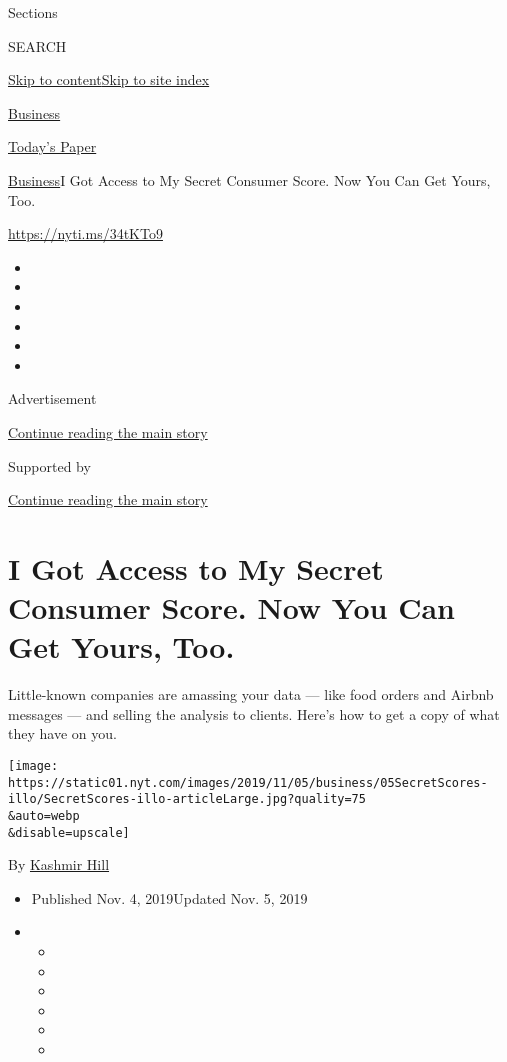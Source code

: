 Sections

SEARCH

\protect\hyperlink{site-content}{Skip to
content}\protect\hyperlink{site-index}{Skip to site index}

\href{https://www.nytimes.com/section/business}{Business}

\href{https://myaccount.nytimes.com/auth/login?response_type=cookie\&client_id=vi}{}

\href{https://www.nytimes.com/section/todayspaper}{Today's Paper}

\href{/section/business}{Business}\textbar{}I Got Access to My Secret
Consumer Score. Now You Can Get Yours, Too.

\url{https://nyti.ms/34tKTo9}

\begin{itemize}
\item
\item
\item
\item
\item
\item
\end{itemize}

Advertisement

\protect\hyperlink{after-top}{Continue reading the main story}

Supported by

\protect\hyperlink{after-sponsor}{Continue reading the main story}

\hypertarget{i-got-access-to-my-secret-consumer-score-now-you-can-get-yours-too}{%
\section{I Got Access to My Secret Consumer Score. Now You Can Get
Yours,
Too.}\label{i-got-access-to-my-secret-consumer-score-now-you-can-get-yours-too}}

Little-known companies are amassing your data --- like food orders and
Airbnb messages --- and selling the analysis to clients. Here's how to
get a copy of what they have on you.

\texttt{[image: https://static01.nyt.com/images/2019/11/05/business/05SecretScores-illo/SecretScores-illo-articleLarge.jpg?quality=75\\\&auto=webp\\\&disable=upscale]}

By \href{https://www.nytimes.com/by/kashmir-hill}{Kashmir Hill}

\begin{itemize}
\item
  Published Nov. 4, 2019Updated Nov. 5, 2019
\item
  \begin{itemize}
  \item
  \item
  \item
  \item
  \item
  \item
  \end{itemize}
\end{itemize}

